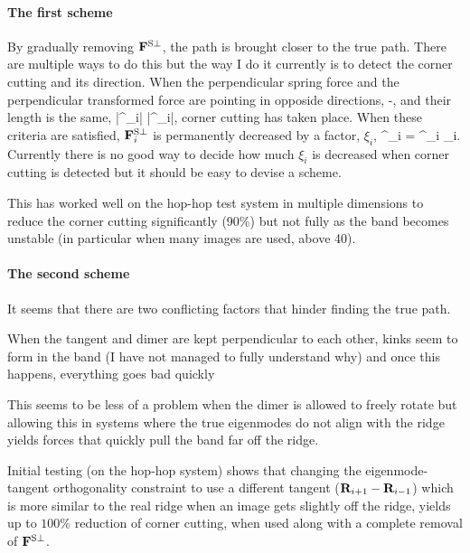 \paragraph{The first scheme}
By gradually removing ${\mathrm{\mathbf{\bm{F}}}}^{\text{S}\perp}$, the path is brought closer to the true path.
There are multiple ways to do this but the way I do it currently is to detect the corner cutting and its direction.
When the perpendicular spring force and the perpendicular transformed force are pointing in opposide directions,
 \approx -,
\eeq
and their length is the same,
|\vF^{\perp}_i| \approx |\vF^{\perp}_i|,
\eeq
corner cutting has taken place.
When these criteria are satisfied, ${\mathrm{\mathbf{\bm{F}}}}^{\text{S}\perp}_i$ is permanently decreased by a factor, $\xi_i$,
\vF^{\perp{}}_i = \vF^{\perp{}}_i \xi_i.
\eeq
Currently there is no good way to decide how much $\xi_i$ is decreased when corner cutting is detected but it should be easy to devise a scheme.

This has worked well on the hop-hop test system in multiple dimensions to reduce the corner cutting significantly (90\%) but not fully as the band becomes unstable (in particular when many images are used, above 40).

\paragraph{The second scheme}
It seems that there are two conflicting factors that hinder finding the true path.
\bit
\item When the tangent and dimer are kept perpendicular to each other, kinks seem to form in the band (I have not managed to fully understand why) and once this happens, everything goes bad quickly
\item This  seems to be less of a problem when the dimer is allowed to freely rotate but allowing this in systems where the true eigenmodes do not align with the ridge yields forces that quickly pull the band far off the ridge. 
\eit

Initial testing (on the hop-hop system) shows that changing the eigenmode-tangent orthogonality constraint to use a different tangent (${\mathrm{\mathbf{\bm{R}}}}_{i+1} - {\mathrm{\mathbf{\bm{R}}}}_{i-1}$) which is more similar to the real ridge when an image gets slightly off the ridge, yields up to $100\%$ reduction of corner cutting, when used along with a complete removal of ${\mathrm{\mathbf{\bm{F}}}}^{\text{S}\perp}$.

